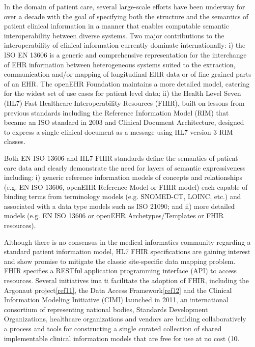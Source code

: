 \documentclass{amia}
\begin{document}
In the domain of patient care, several large-scale efforts have been underway for over a decade with the goal of specifying both the structure and the semantics of patient clinical information in a manner that enables computable semantic interoperability between diverse systems. Two major contributions to the interoperability of clinical information currently dominate internationally: i) the ISO EN 13606 is a generic and comprehensive representation for the interchange of EHR information between heterogeneous systems suited to the extraction, communication and/or mapping of longitudinal EHR data or of fine grained parts of an EHR. The openEHR Foundation maintains a more detailed model, catering for the widest set of use cases for patient level data; ii) the Health Level Seven (HL7) Fast Healthcare Interoperability Resources (FHIR), built on lessons\cite{ref10} from previous standards including the Reference Information Model (RIM) that became an ISO standard in 2003 and Clinical Document Architecture, designed to express a single clinical document as a message using HL7 version 3 RIM classes.

Both EN ISO 13606 and HL7 FHIR standards define the semantics of patient care data and clearly demonstrate the need for layers of semantic expressiveness including: i) generic reference information models of concepts and relationships (e.g. EN ISO 13606, openEHR Reference Model or FHIR model) each capable of binding terms from terminology models (e.g. SNOMED-CT, LOINC, etc.) and associated with a data type models such as ISO 21090; and ii) more detailed models (e.g. EN ISO 13606 or openEHR Archetypes/Templates or FHIR resources). 

Although there is no consensus in the medical informatics community regarding a standard patient information model, HL7 FHIR specifications are gaining interest and show promise to mitigate the classic site-specific data mapping problem. FHIR specifies a RESTful application programming interface (API) to access resources. Several initiatives ima ti facilitate the adoption of FHIR, including the Argonaut project\ref{ref11}, the Data Access Framework\ref{ref12} and the Clinical Information Modeling Initiative (CIMI) launched in 2011, an international consortium of representing national bodies, Standards Development Organizations, healthcare organizations and vendors are building collaboratively a process and tools for constructing a single curated collection of shared implementable clinical information models that are free for use at no cost (10.
\end{document}
